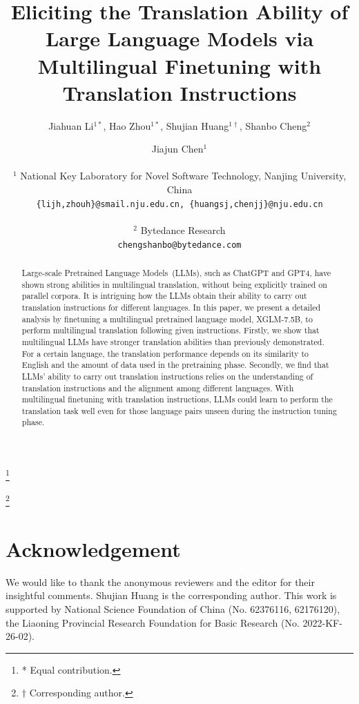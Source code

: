 \documentclass[11pt,a4paper]{article}
\title{Eliciting the Translation Ability of Large Language Models via Multilingual Finetuning with Translation Instructions}
\author{
  Jiahuan Li$^{1*}$, Hao Zhou$^{1*}$, Shujian Huang$^{1\dagger}$, Shanbo Cheng$^2$ \and
  Jiajun Chen$^1$
  \\
  \ \\
  $^1$ National Key Laboratory for Novel Software Technology, Nanjing University, China
\\
  \texttt{\{lijh,zhouh\}@smail.nju.edu.cn, \{huangsj,chenjj\}@nju.edu.cn}
  \\
\\
  $^2$ Bytedance Research
\\
  \texttt{chengshanbo@bytedance.com}
}
\date{}
\newcommand\blfootnote[1]{%
\begingroup
\renewcommand\thefootnote{}\footnote{#1}%
\addtocounter{footnote}{-1}%
\endgroup
}
\begin{document}
\maketitle
\blfootnote{* Equal contribution.}
\blfootnote{$\dagger$ Corresponding author.}
\begin{abstract}
Large-scale Pretrained Language Models~(LLMs), such as ChatGPT and GPT4, have shown strong abilities in multilingual translation, without being explicitly trained on parallel corpora. It is intriguing how the LLMs obtain their ability to carry out translation instructions for different languages. In this paper, we present a detailed analysis by finetuning a multilingual pretrained language model, XGLM-7.5B, to perform multilingual translation following given instructions. Firstly, we show that multilingual LLMs have stronger translation abilities than previously demonstrated. For a certain language, the translation performance depends on its similarity to English and the amount of data used in the pretraining phase. Secondly, we find that LLMs' ability to carry out translation instructions relies on the understanding of translation instructions and the alignment among different languages. With multilingual finetuning with translation instructions, LLMs could learn to perform the translation task well even for those language pairs unseen during the instruction tuning phase.
\end{abstract}









\section*{Acknowledgement}
We would like to thank the anonymous reviewers and the editor for their insightful comments. Shujian Huang is the corresponding author. This work is supported by National Science Foundation of China (No. 62376116, 62176120), the Liaoning Provincial Research Foundation for Basic Research (No. 2022-KF-26-02).






\appendix


  

  
\end{document}
